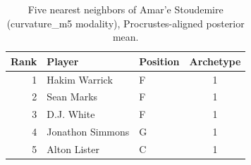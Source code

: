 \begin{table}[htbp]
  \centering\small
  \begin{tabular}{rllc}
    \toprule
    Rank & Player & Position & Archetype \\
    \midrule
    1 & Hakim Warrick & F & 1 \\
    2 & Sean Marks & F & 1 \\
    3 & D.J. White & F & 1 \\
    4 & Jonathon Simmons & G & 1 \\
    5 & Alton Lister & C & 1 \\
    \bottomrule
  \end{tabular}
  \caption{Five nearest neighbors of Amar'e Stoudemire (curvature_m5 modality), Procrustes-aligned posterior mean.}
  \label{tab:Amar_e_Stoudemire_neighbors_curvature_m5}
\end{table}

